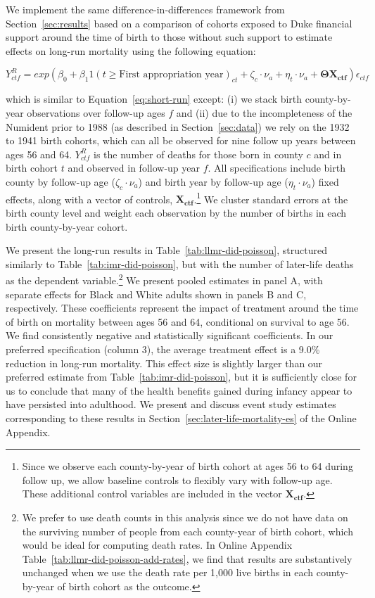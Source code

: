 \documentclass[12pt]{article}
\begin{document}
We implement the same difference-in-differences framework from Section~\ref{sec:results} based on a comparison of cohorts exposed to Duke financial support around the time of birth to those without such support to estimate effects on long-run mortality using the following equation:
\begin{singlespace}
\begin{equation}
    Y^{R}_{ctf} = exp(\beta_0 + \beta_1{1(t \geq \text{First appropriation year})_{ct}} + \zeta_c \cdot \nu_a + \eta_t \cdot \nu_a  +\boldsymbol{\Theta} \mathbf{X_{ctf}})\epsilon_{ctf} \label{eq:long-run}
\end{equation}
\end{singlespace}
\noindent which is similar to Equation~\ref{eq:short-run} except: (i) we stack birth county-by-year observations over follow-up ages $f$ and (ii) due to the incompleteness of the Numident prior to 1988 (as described in Section~\ref{sec:data}) we rely on the 1932 to 1941 birth cohorts, which can all be observed for nine follow up years between ages 56 and 64. 
$Y^{R}_{ctf}$ is the number of deaths for those born in county $c$ and in birth cohort $t$ and observed in follow-up year $f$.
All specifications include birth county by follow-up age ($\zeta_c \cdot \nu_a$) and birth year by follow-up age ($\eta_t \cdot \nu_a$) fixed effects, along with a vector of controls, $\mathbf{X_{ctf}}$.\footnote{
Since we observe each county-by-year of birth cohort at ages 56 to 64 during follow up, we allow baseline controls to flexibly vary with follow-up age.
These additional control variables are included in the vector $\mathbf{X_{ctf}}$.} 
We cluster standard errors at the birth county level and weight each observation by the number of births in each birth county-by-year cohort.

We present the long-run results in Table~\ref{tab:llmr-did-poisson}, structured similarly to Table~\ref{tab:imr-did-poisson}, but with the number of later-life deaths as the dependent variable.\footnote{We prefer to use death counts in this analysis since we do not have data on the surviving number of people from each county-year of birth cohort, which would be ideal for computing death rates. In Online Appendix Table~\ref{tab:llmr-did-poisson-add-rates}, we find that results are substantively unchanged when we use the death rate per 1,000 live births in each county-by-year of birth cohort as the outcome.}  
We present pooled estimates in panel A, with separate effects for Black and White adults shown in panels B and C, respectively.
These coefficients represent the impact of treatment around the time of birth on mortality between ages 56 and 64, conditional on survival to age 56. 
We find consistently negative and statistically significant coefficients. 
In our preferred specification (column 3), the average treatment effect is a 9.0\% reduction in long-run mortality.
This effect size is slightly larger than our preferred estimate from Table~\ref{tab:imr-did-poisson}, but it is sufficiently close for us to conclude that many of the health benefits gained during infancy appear to have persisted into adulthood. 
We present and discuss event study estimates corresponding to these results in Section~\ref{sec:later-life-mortality-es} of the Online Appendix. 
\end{document}
